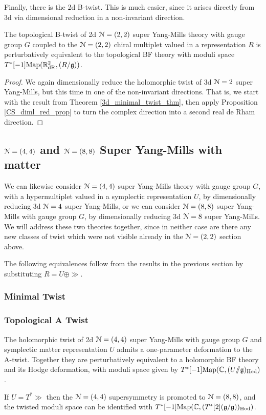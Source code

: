 \documentclass[10pt, oneside]{article}
\newcommand{\ham}{/\!\!/}
\begin{document}
Finally, there is the 2d B-twist.  This is much easier, since it arises directly from 3d via dimensional reduction in a non-invariant direction.
\begin{theorem} \label{2d_2_B_twist_thm}
The topological B-twist of 2d $\mathcal{N}=(2,2)$ super Yang-Mills theory with gauge group $G$ coupled to the $\mathcal{N}=(2,2)$ chiral multiplet valued in a representation $R$ is perturbatively equivalent to the topological BF theory with moduli space $T^*[-1]\mathrm{Map}(\mathbb R^2_{\mathrm{dR}}, (R/\mathfrak{g}))$.
\end{theorem}

\begin{proof}
We again dimensionally reduce the holomorphic twist of 3d $\mathcal{N}=2$ super Yang-Mills, but this time in one of the non-invariant directions.  That is, we start with the result from Theorem \ref{3d_minimal_twist_thm}, then apply Proposition \ref{CS_diml_red_prop} to turn the complex direction into a second real de Rham direction.
\end{proof}

\subsection{\texorpdfstring{$\mathcal N=(4,4)$}{N=(4,4)} and \texorpdfstring{$\mathcal N=(8,8)$}{N=(8,8)} Super Yang-Mills with matter} \label{sect:2d(4,4)}
We can likewise consider $\mathcal{N}=(4,4)$ super Yang-Mills theory with gauge group $G$, with a hypermultiplet valued in a symplectic representation $U$, by dimensionally reducing 3d $\mathcal{N}=4$ super Yang-Mills, or we can consider $\mathcal{N}=(8,8)$ super Yang-Mills with gauge group $G$, by dimensionally reducing 3d $\mathcal{N}=8$ super Yang-Mills.  We will address these two theories together, since in neither case are there any new classes of twist which were not visible already in the $\mathcal{N}=(2,2)$ section above.  

The following equivalences follow from the results in the previous section by substituting $R = U \oplus \gg$.

\subsubsection{Minimal Twist} \label{sect:2d44minimaltwist}
\subsubsection{Topological A Twist} \label{sect:2d44Atwist}

\begin{theorem}
The holomorphic twist of 2d $\mathcal{N}=(4,4)$ super Yang-Mills with gauge group $G$ and symplectic matter representation $U$ admits a one-parameter deformation to the A-twist.  Together they are perturbatively equivalent to a holomorphic BF theory and its Hodge deformation, with moduli space given by $T^*[-1]\mr{Map}(\CC, (U \ham \gg)_{\mr{Hod}})$.

If $U = T^*\gg$ then the $\mathcal{N}=(4,4)$ supersymmetry is promoted to $\mathcal{N}=(8,8)$, and the twisted moduli space can be identified with  $T^*[-1]\mathrm{Map}(\mathbb C, (T^*[2](\mathfrak{g} / \mathfrak{g}))_{\mathrm{Hod}})$.
\end{theorem}
\end{document}
